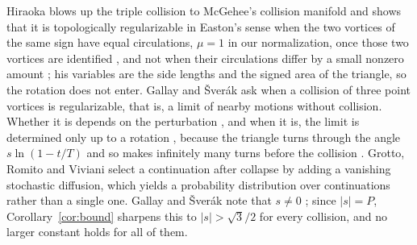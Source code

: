 \documentclass[11pt]{article}
\theoremstyle{definition}
\begin{document}
Hiraoka \cite{hiraoka2008} blows up the triple collision to McGehee's collision manifold and shows that it is topologically regularizable in Easton's sense when the two vortices of the same sign have equal circulations, $\mu = 1$ in our normalization, once those two vortices are identified \cite[Theorem~1]{hiraoka2008}, and not when their circulations differ by a small nonzero amount \cite[Theorem~2]{hiraoka2008}; his variables are the side lengths and the signed area of the triangle, so the rotation does not enter. Gallay and \v{S}ver\'ak \cite{gallay2026} ask when a collision of three point vortices is regularizable, that is, a limit of nearby motions without collision. Whether it is depends on the perturbation \cite[Theorems~5.8, 5.10, 5.15]{gallay2026}, and when it is, the limit is determined only up to a rotation \cite[Sect.~1]{gallay2026}, because the triangle turns through the angle $s \ln(1 - t/T)$ and so makes infinitely many turns before the collision \cite[Sect.~5.2]{gallay2026}. Grotto, Romito and Viviani \cite{grv2023} select a continuation after collapse by adding a vanishing stochastic diffusion, which yields a probability distribution over continuations rather than a single one. Gallay and \v{S}ver\'ak note that $s \neq 0$ \cite[Remark~E.2]{gallay2026}; since $|s| = P$, Corollary~\ref{cor:bound} sharpens this to $|s| > \sqrt{3}/2$ for every collision, and no larger constant holds for all of them.
\end{document}
